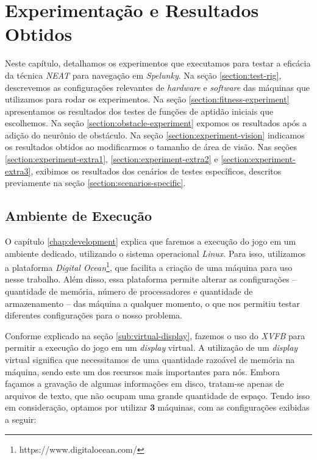 \chapter{\label{chap:experimentation-and-results}Experimentação e Resultados
Obtidos}
Neste capítulo, detalhamos os experimentos que executamos para testar a eficácia
da técnica \textit{NEAT} para navegação em \textit{Spelunky}. Na seção
\ref{section:test-rig}, descrevemos as configurações relevantes de
\textit{hardware} e \textit{software} das máquinas que utilizamos para rodar os
experimentos. Na seção \ref{section:fitness-experiment} apresentamos os
resultados dos testes de funções de aptidão iniciais que escolhemos. Na seção
\ref{section:obstacle-experiment} expomos os resultados após a adição do
neurônio de obstáculo. Na seção \ref{section:experiment-vision} indicamos os
resultados obtidos ao modificarmos o tamanho de área de visão. Nas seções
\ref{section:experiment-extra1}, \ref{section:experiment-extra2} e
\ref{section:experiment-extra3}, exibimos os resultados dos cenários de testes
específicos, descritos previamente na seção \ref{section:scenarios-specific}.

\section{\label{section:test-rig}Ambiente de Execução}
O capítulo \ref{chap:development} explica que faremos a execução do jogo em um
ambiente dedicado, utilizando o sistema operacional \textit{Linux}. Para isso,
utilizamos a plataforma \textit{Digital
Ocean}\footnote{https://www.digitalocean.com/}, que facilita a criação de uma
máquina para uso nesse trabalho. Além disso, essa plataforma permite alterar as
configurações -- quantidade de memória, número de processadores e quantidade de
armazenamento -- das máquina a qualquer momento, o que nos permitiu testar
diferentes configurações para o nosso problema.

Conforme explicado na seção \ref{sub:virtual-display}, fazemos o uso do
\textit{XVFB} para permitir a execução do jogo em um \textit{display} virtual. A
utilização de um \textit{display} virtual significa que necessitamos de uma
quantidade razoável de memória na máquina, sendo este um dos recursos mais
importantes para nós. Embora façamos a gravação de algumas informações em disco,
tratam-se apenas de arquivos de texto, que não ocupam uma grande quantidade de
espaço. Tendo isso em consideração, optamos por utilizar \textbf{3} máquinas,
com as configurações exibidas a seguir:

